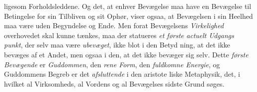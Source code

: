 ligesom Forholdsleddene. Og det, at enhver Bevægelse maa have en
Bevægelse til Betingelse for sin Tilbliven og sit Ophør, viser ogsaa,
at Bevægelsen i sin Heelhed maa være uden Begyndelse og Ende.
Men forat Bevægelsens \emph{Virkelighed} overhovedet skal kunne
tænkes, maa der statueres \emph{et første actuelt Udgangs\-%
punkt}, der selv maa være \emph{ubevæget}, ikke blot i den Betyd\-%
ning, at det ikke bevæges af et Andet, men ogsaa i den, at
det ikke bevæger sig selv. Dette \emph{første Bevægende} er
\emph{Guddommen}, den \emph{rene Form}, den \emph{fuldkomne Energie},
og Guddommens Begreb er det \emph{afsluttende} i den aristote\-%
liske Metaphysik, det, i hvilket al Virksomheds, al Vordens og
al Bevægelses sidste Grund søges.

